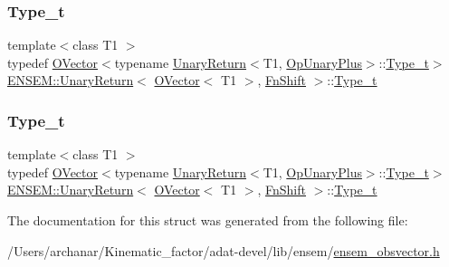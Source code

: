 \subsubsection{\texorpdfstring{Type\_t}{Type\_t}\hspace{0.1cm}{\footnotesize\ttfamily [2/3]}}
{\footnotesize\ttfamily template$<$class T1 $>$ \\
typedef \mbox{\hyperlink{classENSEM_1_1OVector}{O\+Vector}}$<$typename \mbox{\hyperlink{structENSEM_1_1UnaryReturn}{Unary\+Return}}$<$T1, \mbox{\hyperlink{structENSEM_1_1OpUnaryPlus}{Op\+Unary\+Plus}}$>$\+::\mbox{\hyperlink{structENSEM_1_1UnaryReturn_3_01OVector_3_01T1_01_4_00_01FnShift_01_4_a45f08020845d964612b7c715afabda12}{Type\+\_\+t}}$>$ \mbox{\hyperlink{structENSEM_1_1UnaryReturn}{E\+N\+S\+E\+M\+::\+Unary\+Return}}$<$ \mbox{\hyperlink{classENSEM_1_1OVector}{O\+Vector}}$<$ T1 $>$, \mbox{\hyperlink{structENSEM_1_1FnShift}{Fn\+Shift}} $>$\+::\mbox{\hyperlink{structENSEM_1_1UnaryReturn_3_01OVector_3_01T1_01_4_00_01FnShift_01_4_a45f08020845d964612b7c715afabda12}{Type\+\_\+t}}}

\mbox{\label{structENSEM_1_1UnaryReturn_3_01OVector_3_01T1_01_4_00_01FnShift_01_4_a45f08020845d964612b7c715afabda12}} 
\subsubsection{\texorpdfstring{Type\_t}{Type\_t}\hspace{0.1cm}{\footnotesize\ttfamily [3/3]}}
{\footnotesize\ttfamily template$<$class T1 $>$ \\
typedef \mbox{\hyperlink{classENSEM_1_1OVector}{O\+Vector}}$<$typename \mbox{\hyperlink{structENSEM_1_1UnaryReturn}{Unary\+Return}}$<$T1, \mbox{\hyperlink{structENSEM_1_1OpUnaryPlus}{Op\+Unary\+Plus}}$>$\+::\mbox{\hyperlink{structENSEM_1_1UnaryReturn_3_01OVector_3_01T1_01_4_00_01FnShift_01_4_a45f08020845d964612b7c715afabda12}{Type\+\_\+t}}$>$ \mbox{\hyperlink{structENSEM_1_1UnaryReturn}{E\+N\+S\+E\+M\+::\+Unary\+Return}}$<$ \mbox{\hyperlink{classENSEM_1_1OVector}{O\+Vector}}$<$ T1 $>$, \mbox{\hyperlink{structENSEM_1_1FnShift}{Fn\+Shift}} $>$\+::\mbox{\hyperlink{structENSEM_1_1UnaryReturn_3_01OVector_3_01T1_01_4_00_01FnShift_01_4_a45f08020845d964612b7c715afabda12}{Type\+\_\+t}}}



The documentation for this struct was generated from the following file\+:\begin{DoxyCompactItemize}
\item 
/\+Users/archanar/\+Kinematic\+\_\+factor/adat-\/devel/lib/ensem/\mbox{\hyperlink{adat-devel_2lib_2ensem_2ensem__obsvector_8h}{ensem\+\_\+obsvector.\+h}}\end{DoxyCompactItemize}
